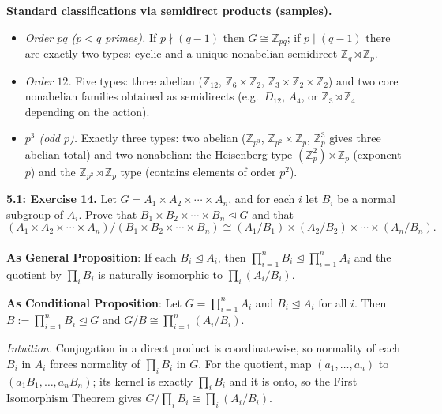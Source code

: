 \documentclass[11pt]{article}
\theoremstyle{definition}
\begin{document}
\medskip
\textbf{Standard classifications via semidirect products (samples).}
\begin{itemize}\itemsep4pt
  \item \emph{Order $pq$ ($p<q$ primes).} If $p\nmid(q-1)$ then $G\cong \mathbb{Z}_{pq}$; if $p\mid(q-1)$ there are exactly two types: cyclic and a unique nonabelian semidirect $\mathbb{Z}_q\rtimes \mathbb{Z}_p$.
  \item \emph{Order $12$.} Five types: three abelian ($\mathbb{Z}_{12}$, $\mathbb{Z}_6\times \mathbb{Z}_2$, $\mathbb{Z}_3\times \mathbb{Z}_2\times \mathbb{Z}_2$) and two core nonabelian families obtained as semidirects (e.g.\ $D_{12}$, $A_4$, or $\mathbb{Z}_3\rtimes \mathbb{Z}_4$ depending on the action).
  \item \emph{$p^3$ (odd $p$).} Exactly three types: two abelian ($\mathbb{Z}_{p^3}$, $\mathbb{Z}_{p^2}\times \mathbb{Z}_p$, $\mathbb{Z}_p^3$ gives three abelian total) and two nonabelian: the Heisenberg-type $(\mathbb{Z}_p^2)\rtimes \mathbb{Z}_p$ (exponent $p$) and the $\mathbb{Z}_{p^2}\rtimes \mathbb{Z}_p$ type (contains elements of order $p^2$).
\end{itemize}

\newpage

\noindent \textbf{5.1: Exercise 14.} Let $G=A_1\times A_2\times\cdots\times A_n$, and for each $i$ let $B_i$ be a normal subgroup of $A_i$. Prove that $B_1\times B_2\times\cdots\times B_n\unlhd G$ and that
\[
(A_1\times A_2\times\cdots\times A_n)/(B_1\times B_2\times\cdots\times B_n)\cong (A_1/B_1)\times(A_2/B_2)\times\cdots\times(A_n/B_n). 
\] \\ %

\noindent\textbf{As General Proposition}: If each $B_i\unlhd A_i$, then $\prod_{i=1}^n B_i\unlhd \prod_{i=1}^n A_i$ and the quotient by $\prod_i B_i$ is naturally isomorphic to $\prod_i (A_i/B_i)$.

\noindent \textbf{As Conditional Proposition}: Let $G=\prod_{i=1}^n A_i$ and $B_i\unlhd A_i$ for all $i$. Then $B:=\prod_{i=1}^n B_i\unlhd G$ and $G/B\cong \prod_{i=1}^n (A_i/B_i)$.

\newpage

\dotfill

\emph{Intuition.} Conjugation in a direct product is coordinatewise, so normality of each $B_i$ in $A_i$ forces normality of $\prod_i B_i$ in $G$. For the quotient, map $(a_1,\ldots,a_n)$ to $(a_1B_1,\ldots,a_nB_n)$; its kernel is exactly $\prod_i B_i$ and it is onto, so the First Isomorphism Theorem gives $G/\prod_i B_i\cong \prod_i (A_i/B_i)$.\\
\end{document}
